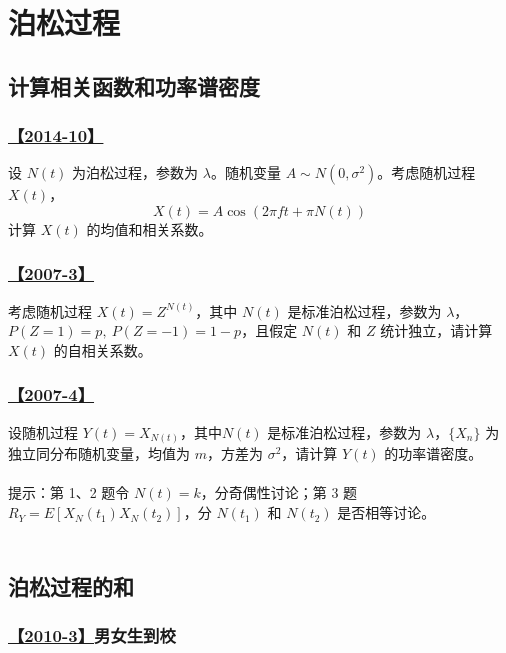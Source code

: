 \setcounter{section}{0}
\setcounter{subsection}{0}

\chapter{泊松过程}

\section{计算相关函数和功率谱密度}

\subsection{\hyperref[A2014-10]{【2014-10】}}\label{Q2014-10}

设 $N(t)$ 为泊松过程，参数为 $\lambda$。随机变量 $A\sim N(0, \sigma^2)$。考虑随机过程 $X(t)$，
$$
X(t)=A\cos(2\pi ft+\pi N(t))
$$
计算 $X(t)$ 的均值和相关系数。

\subsection{\hyperref[A2007-3]{【2007-3】}}\label{Q2007-3}

考虑随机过程 $X(t)=Z^{N(t)}$，其中 $N(t)$ 是标准泊松过程，参数为 $\lambda$，$P(Z=1)=p,\ P(Z=-1)=1-p$，且假定 $N(t)$ 和 $Z$ 统计独立，请计算 $X(t)$ 的自相关系数。

\subsection{\hyperref[A2007-4]{【2007-4】}}\label{Q2007-4}

设随机过程 $Y(t)=X_{N(t)}$，其中$N(t)$ 是标准泊松过程，参数为 $\lambda$，$\{X_n\}$ 为独立同分布随机变量，均值为 $m$，方差为 $\sigma^2$，请计算 $Y(t)$ 的功率谱密度。
\\\\
提示：第 1、2 题令 $N(t)=k$，分奇偶性讨论；第 3 题 $R_Y=E[X_N(t_1)X_N(t_2)]$，分 $N(t_1)$ 和 $N(t_2)$ 是否相等讨论。
\\\\
\section{泊松过程的和}

\subsection{\hyperref[A2010-3]{【2010-3】}男女生到校}\label{Q2010-3}

